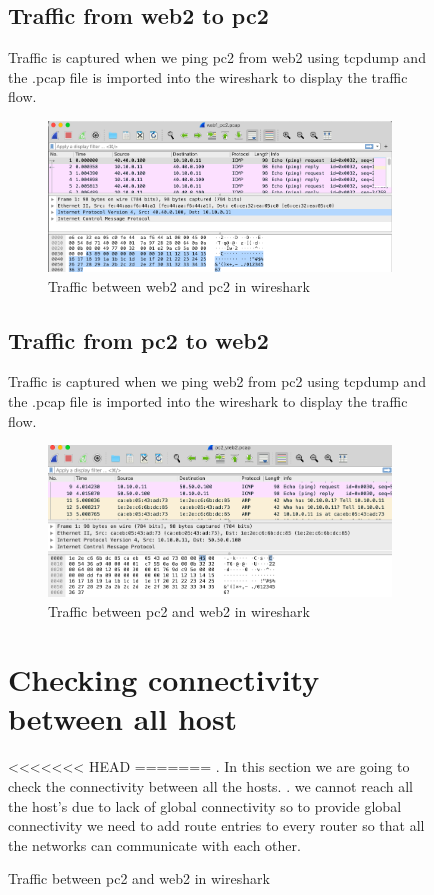 \begin{figure}[H]
\subsection{Traffic from web2 to pc2}
Traffic is captured when we ping pc2 from web2 using tcpdump and the .pcap file is imported into the wireshark to display the traffic flow.
\begin{figure}[H]
\centering
  \includegraphics[width=400pt]{Images/web1_pc2_tcpdump.png}
  \caption{Traffic between web2 and pc2 in wireshark}
  \label{fig:2.4.3}
\end{figure}
\subsection{Traffic from pc2 to web2}
Traffic is captured when we ping web2 from pc2 using tcpdump and the .pcap file is imported into the wireshark to display the traffic flow.
\begin{figure}[H]
\centering
  \includegraphics[width=400pt]{Images/pc2_web2_tcpdump.png}
  \caption{Traffic between pc2 and web2 in wireshark}
  \label{fig:2.4.4}
\end{figure}

\section{Checking connectivity between all host}
<<<<<<< HEAD
=======
. In this section we are going to check the connectivity between all the hosts.
. we cannot reach all the host's due to lack of global connectivity so to provide global connectivity we need to add route entries to every router so that all the networks can communicate with each other.

\end{figure}
